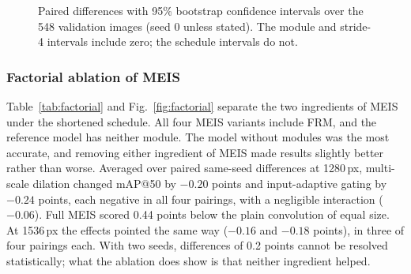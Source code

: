 \documentclass[preprint,12pt]{elsarticle}
\begin{document}
\begin{figure}[t]
\centering
{}
\caption{Paired differences with 95\% bootstrap confidence intervals over the 548
validation images (seed 0 unless stated). The module and stride-4 intervals include
zero; the schedule intervals do not.}
\label{fig:forest}
\end{figure}

\subsubsection{Factorial ablation of MEIS}
\label{sec:res-factorial}

Table~\ref{tab:factorial} and Fig.~\ref{fig:factorial} separate the two ingredients
of MEIS under the shortened schedule. All four MEIS variants include FRM, and the
reference model has neither module. The model without modules was the most
accurate, and removing either ingredient of MEIS made results slightly better
rather than worse. Averaged over paired same-seed differences at 1280\,px,
multi-scale dilation changed mAP@50 by $-0.20$ points and input-adaptive gating by
$-0.24$ points, each negative in all four pairings, with a negligible interaction
($-0.06$). Full MEIS scored 0.44 points below the plain convolution of equal size.
At 1536\,px the effects pointed the same way ($-0.16$ and $-0.18$ points), in three
of four pairings each. With two seeds, differences of 0.2 points cannot be resolved
statistically; what the ablation does show is that neither ingredient helped.
\end{document}
